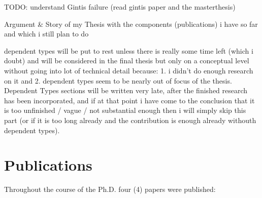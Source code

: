 TODO: understand Gintis failure (read gintis paper and the masterthesis)

Argument \& Story of my Thesis with the components (publications) i have so far and which i still plan to do

dependent types will be put to rest unless there is really some time left (which i doubt) and will be considered in the final thesis but only on a conceptual level without going into lot of technical detail because: 1. i didn't do enough research on it and 2. dependent types seem to be nearly out of focus of the thesis. Dependent Types sections will be written very late, after the finished research has been incorporated, and if at that point i have come to the conclusion that it is too unfinished / vague / not substantial enough then i will simply skip this part (or if it is too long already and the contribution is enough already withouth dependent types).

\section{Publications}
Throughout the course of the Ph.D. four (4) papers were published:

